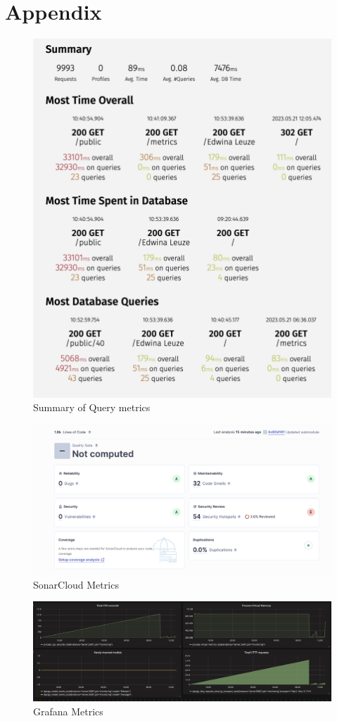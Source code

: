 \section*{Appendix}
\begin{figure}[ht]
    \centering
    \includegraphics[scale = 0.6]{images/silk.png}
    \caption{Summary of Query metrics}
    \label{fig:silk metrics}
\end{figure}

\begin{figure}[ht]
    \centering
    \includegraphics[scale = 0.4]{images/SonarCloud.png}
    \caption{SonarCloud Metrics}
    \label{fig:sonarcloud}
\end{figure}

\begin{figure}[ht]
    \centering
    \includegraphics[scale = 0.3]{images/Grafana.png}
    \caption{Grafana Metrics}
    \label{fig:grafana}
\end{figure}
